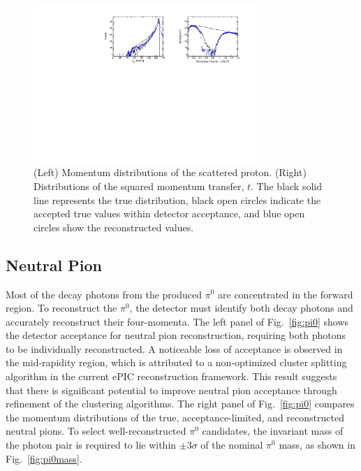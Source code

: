 \documentclass[letterpaper,12pt]{article}
\begin{document}
\begin{figure}[h]
    \centering
    \includegraphics[width=0.75\textwidth]{Figures/proton_rec.pdf}
    \caption{(Left) Momentum distributions of the scattered proton. (Right) Distributions of the squared momentum transfer, $t$. The black solid line represents the true distribution, black open circles indicate the accepted true values within detector acceptance, and blue open circles show the reconstructed values.}
\label{fig:protonrec}
\end{figure}

\subsection{Neutral Pion}\label{subsec:NeutralPion}
Most of the decay photons from the produced $\pi^{0}$ are concentrated in the forward region. To reconstruct the $\pi^{0}$, the detector must identify both decay photons and accurately reconstruct their four-momenta. The left panel of Fig.~\ref{fig:pi0} shows the detector acceptance for neutral pion reconstruction, requiring both photons to be individually reconstructed. A noticeable loss of acceptance is observed in the mid-rapidity region, which is attributed to a non-optimized cluster splitting algorithm in the current ePIC reconstruction framework. This result suggests that there is significant potential to improve neutral pion acceptance through refinement of the clustering algorithms. The right panel of Fig.~\ref{fig:pi0} compares the momentum distributions of the true, acceptance-limited, and reconstructed neutral pions. To select well-reconstructed $\pi^{0}$ candidates, the invariant mass of the photon pair is required to lie within $\pm3\sigma$ of the nominal $\pi^{0}$ mass, as shown in Fig.~\ref{fig:pi0mass}.
\end{document}
